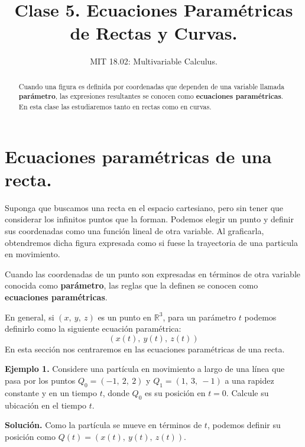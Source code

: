 \documentclass[12pt]{article}
\title{Clase 5. Ecuaciones Paramétricas de Rectas y Curvas.}
\author{MIT 18.02: Multivariable Calculus.}
\date{}
\begin{document}
\newcommand{\vecmat}[1]{\mathbf{#1}}                          %
\newcommand{\overvec}[1]{\overrightarrow{#1}}                 %
\newcommand{\R}[0]{\mathbb{R}}                                %

\maketitle

\begin{abstract}
\noindent Cuando una figura es definida por coordenadas que dependen de una variable llamada \textbf{parámetro}, las expresiones resultantes se conocen como \textbf{ecuaciones paramétricas}. En esta clase las estudiaremos tanto en rectas como en curvas.
\end{abstract}


\section{Ecuaciones paramétricas de una recta.}

Suponga que buscamos una recta en el espacio cartesiano, pero sin tener que considerar los infinitos puntos que la forman. Podemos elegir un punto y definir sus coordenadas como una función lineal de otra variable. Al graficarla, obtendremos dicha figura expresada como si fuese la trayectoria de una particula en movimiento.

Cuando las coordenadas de un punto son expresadas en términos de otra variable conocida como \textbf{parámetro}, las reglas que la definen se conocen como \textbf{ecuaciones paramétricas}.

En general, si $(x, \ y, \ z)$ es un punto en $\R^{3}$, para un parámetro $t$ podemos definirlo como la siguiente ecuación paramétrica:
\[
  (x(t), \ y(t), \ z(t))
\]
En esta sección nos centraremos en las ecuaciones paramétricas de una recta.

\textbf{Ejemplo 1.} Considere una partícula en movimiento a largo de una línea que pasa por los puntos $Q_{0} = (-1, \ 2, \ 2)$ y $Q_{1} = (1, \ 3, \ -1)$ a una rapidez constante y en un tiempo $t$, donde $Q_{0}$ es su posición en $t = 0$. Calcule su ubicación en el tiempo $t$.

\textbf{Solución.} Como la partícula se mueve en términos de $t$, podemos definir su posición como $Q(t) = (x(t), \ y(t), \ z(t))$.
\end{document}
